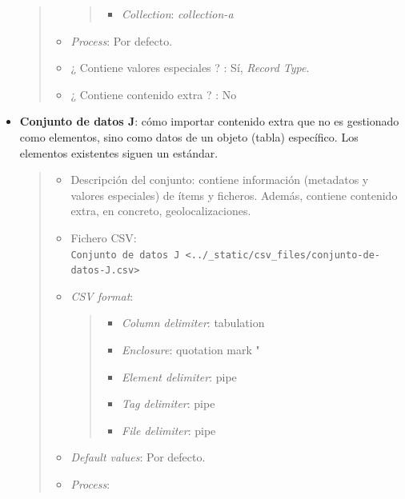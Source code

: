 \documentclass[
]{article}
\providecommand{\tightlist}{%
  \setlength{\itemsep}{0pt}\setlength{\parskip}{0pt}}
\begin{document}
\begin{itemize}
\begin{quote}
\begin{itemize}
    \begin{quote}
    \begin{itemize}
    \tightlist
    \item
      \emph{Collection}: \emph{collection-a}
    \end{itemize}
    \end{quote}
  \item
    \emph{Process}: Por defecto.
  \item
    ¿ Contiene valores especiales ? : Sí, \emph{Record Type}.
  \item
    ¿ Contiene contenido extra ? : No
  \end{itemize}
  \end{quote}
\item
  \textbf{Conjunto de datos J}: cómo importar contenido extra que no es
  gestionado como elementos, sino como datos de un objeto (tabla)
  específico. Los elementos existentes siguen un estándar.

  \begin{quote}
  \begin{itemize}
  \item
    Descripción del conjunto: contiene información (metadatos y valores
    especiales) de ítems y ficheros. Además, contiene contenido extra,
    en concreto, geolocalizaciones.
  \item
    Fichero CSV:
    \texttt{Conjunto\ de\ datos\ J\ \textless{}../\_static/csv\_files/conjunto-de-datos-J.csv\textgreater{}}
  \item
    \emph{CSV format}:

    \begin{quote}
    \begin{itemize}
    \tightlist
    \item
      \emph{Column delimiter}: tabulation
    \item
      \emph{Enclosure}: quotation mark "
    \item
      \emph{Element delimiter}: pipe
    \item
      \emph{Tag delimiter}: pipe
    \item
      \emph{File delimiter}: pipe
    \end{itemize}
    \end{quote}
  \item
    \emph{Default values}: Por defecto.
  \item
    \emph{Process}:


\end{itemize}
\end{quote}
\end{itemize}
\end{document}
